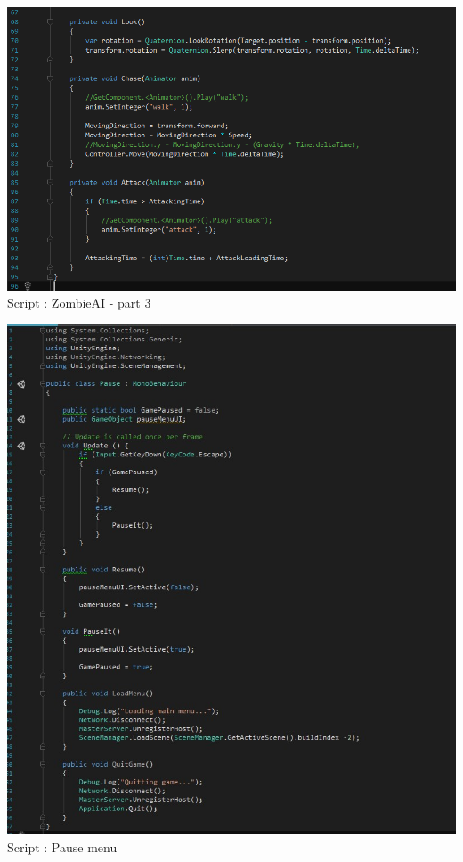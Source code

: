 \documentclass[12pt]{article}
\begin{document}
\begin{center}
    \includegraphics[scale = 0.75]{Script_ZombieAI_-_3.PNG}\\[1cm]
    Script : ZombieAI - part 3
    
    \includegraphics[scale = 0.75]{Pause_script_screen.jpg}\\[1cm]
    Script : Pause menu
   
\end{center}
\end{document}
